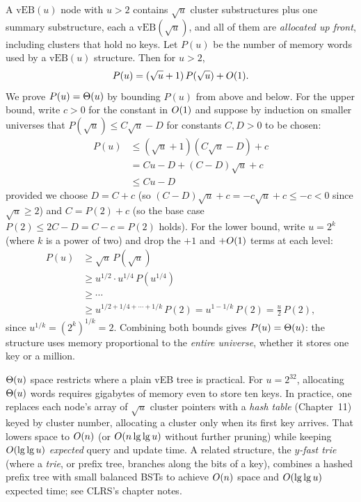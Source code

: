 A $\text{vEB}(u)$ node with $u > 2$ contains $\sqrt{u}$ cluster
substructures plus one summary substructure, each a $\text{vEB}(\sqrt{u})$, and
all of them are \emph{allocated up front}, including clusters that hold no keys.
Let $P(u)$ be the number of memory words used by a $\text{vEB}(u)$ structure. Then for $u > 2$,
\[
  P(u) = (\sqrt{u} + 1)\,P(\sqrt{u}) + O(1).
\]
We prove $P(u) = \Theta(u)$ by bounding $P(u)$ from above and below. For the
upper bound, write $c > 0$ for the constant in $O(1)$ and suppose by induction on smaller universes that $P(\sqrt{u}) \le C\sqrt{u} - D$ for constants $C, D > 0$ to be chosen:
\begin{align*}
  P(u) &\le (\sqrt{u} + 1)(C\sqrt{u} - D) + c \\
       &= Cu - D + (C - D)\sqrt{u} + c \\
       &\le Cu - D
\end{align*}
provided we choose $D = C + c$ (so $(C-D)\sqrt{u} + c = -c\sqrt{u} + c \le -c < 0$ since $\sqrt{u} \ge 2$) and $C = P(2) + c$ (so the base case $P(2) \le 2C - D = C - c = P(2)$ holds). For the lower bound, write $u = 2^k$ (where $k$ is a power of two) and drop the $+1$ and $+O(1)$ terms at each level:
\begin{align*}
  P(u) &\ge \sqrt{u}\,P(\sqrt{u}) \\
       &\ge u^{1/2}\cdot u^{1/4}\,P(u^{1/4}) \\
       &\ge \cdots \\
       &\ge u^{1/2 + 1/4 + \cdots + 1/k}\,P(2)
        = u^{1 - 1/k}\,P(2)
        = \frac{u}{2}\,P(2),
\end{align*}
since $u^{1/k} = (2^k)^{1/k} = 2$. Combining both bounds gives $P(u) = \Theta(u)$: the structure uses memory proportional to the
\emph{entire universe}, whether it stores one key or a million.

\begin{trapbox}
$\Theta(u)$ space restricts where a plain vEB tree is practical. For $u=2^{32}$, allocating $\Theta(u)$ words requires gigabytes of memory even to store ten keys. In
practice, one replaces each node's array of $\sqrt{u}$ cluster pointers with a
\emph{hash table} (Chapter~11) keyed by cluster number, allocating a cluster only
when its first key arrives. That lowers space to $O(n)$ (or $O(n \lg\lg u)$ without further pruning) while keeping $O(\lg\lg u)$ \emph{expected} query and update time. A related structure, the \emph{$y$-fast trie} (where a \emph{trie}, or prefix tree, branches along the bits of a key), combines a hashed prefix tree with small balanced BSTs to achieve $O(n)$ space and $O(\lg\lg u)$ expected time; see CLRS's chapter notes.
\end{trapbox}

